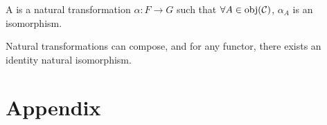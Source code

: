 \documentclass[openany, a5paper]{book}
\begin{document}
A  is a natural transformation $\alpha \colon F \to G$ such that $\forall A \in \operatorname{obj}(\mathcal C)$, $\alpha_A$ is an isomorphism.

Natural transformations can compose, and for any functor, there exists an identity natural isomorphism.

\appendix
\chapter{Appendix}

\backmatter
\nocite{*} %
\printbibliography[heading=bibliography, title={Bibliography}]


\printindex
\end{document}
